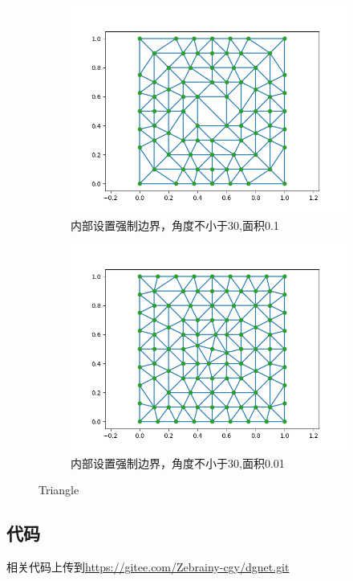 \begin{figure}[H]
    \begin{subfigure}{0.5\textwidth}  
        \centering  
        \includegraphics[width=0.9\linewidth]{./pics/final/spq30a0_1e.png}  
        \caption{内部设置强制边界，角度不小于30,面积0.1}  
    \end{subfigure}%
    \begin{subfigure}{0.5\textwidth}  
        \centering  
        \includegraphics[width=0.9\linewidth]{./pics/final/spq30a0_01e.png}  
        \caption{内部设置强制边界，角度不小于30,面积0.01}
    \end{subfigure}  
    \caption{Triangle}  
\end{figure} 

\subsection*{代码}
相关代码上传到\url{https://gitee.com/Zebrainy-cgy/dgnet.git}


